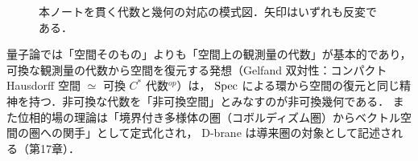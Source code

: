 \begin{figure}[H]
\centering
{}
\caption{本ノートを貫く代数と幾何の対応の模式図．矢印はいずれも反変である．}
\end{figure}

\begin{physbox}[物理における圏論的視点]
量子論では「空間そのもの」よりも「空間上の観測量の代数」が基本的であり，
可換な観測量の代数から空間を復元する発想（Gelfand 双対性：コンパクト Hausdorff 空間 $\simeq$ 可換 $C^*$ 代数$^{op}$）は，
$\operatorname{Spec}$ による環から空間の復元と同じ精神を持つ．非可換な代数を「非可換空間」とみなすのが非可換幾何である．
また位相的場の理論は「境界付き多様体の圏（コボルディズム圏）からベクトル空間の圏への関手」として定式化され，
D-brane は導来圏の対象として記述される（第17章）．
\end{physbox}
